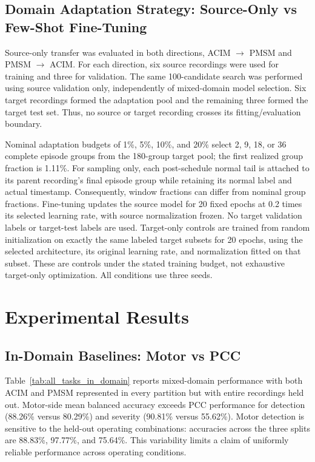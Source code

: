 \documentclass[letterpaper,journal]{IEEEtran}
\begin{document}
\subsection{Domain Adaptation Strategy: Source-Only vs Few-Shot Fine-Tuning}
\label{sec:domain_adaptation}

Source-only transfer was evaluated in both directions, ACIM $\rightarrow$ PMSM and PMSM $\rightarrow$ ACIM. For each direction, six source recordings were used for training and three for validation. The same 100-candidate search was performed using source validation only, independently of mixed-domain model selection. Six target recordings formed the adaptation pool and the remaining three formed the target test set. Thus, no source or target recording crosses its fitting/evaluation boundary.

Nominal adaptation budgets of 1\%, 5\%, 10\%, and 20\% select 2, 9, 18, or 36 complete episode groups from the 180-group target pool; the first realized group fraction is 1.11\%. For sampling only, each post-schedule normal tail is attached to its parent recording's final episode group while retaining its normal label and actual timestamp. Consequently, window fractions can differ from nominal group fractions. Fine-tuning updates the source model for 20 fixed epochs at 0.2 times its selected learning rate, with source normalization frozen. No target validation labels or target-test labels are used. Target-only controls are trained from random initialization on exactly the same labeled target subsets for 20 epochs, using the selected architecture, its original learning rate, and normalization fitted on that subset. These are controls under the stated training budget, not exhaustive target-only optimization. All conditions use three seeds.

\section{Experimental Results}
\label{sec:results}
\subsection{In-Domain Baselines: Motor vs PCC}
\label{sec:in_domain}

Table~\ref{tab:all_tasks_in_domain} reports mixed-domain performance with both ACIM and PMSM represented in every partition but with entire recordings held out. Motor-side mean balanced accuracy exceeds PCC performance for detection (88.26\% versus 80.29\%) and severity (90.81\% versus 55.62\%). Motor detection is sensitive to the held-out operating combinations: accuracies across the three splits are 88.83\%, 97.77\%, and 75.64\%. This variability limits a claim of uniformly reliable performance across operating conditions.
\end{document}
